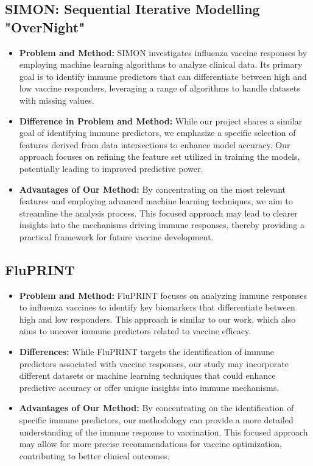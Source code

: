 \documentclass[runningheads,a4paper,11pt]{report}
\begin{document}
\subsection{SIMON: Sequential Iterative Modelling "OverNight"} \cite{SIMON1}
\begin{itemize}
    \item \textbf{Problem and Method:} SIMON investigates influenza vaccine responses by employing machine learning algorithms to analyze clinical data. Its primary goal is to identify immune predictors that can differentiate between high and low vaccine responders, leveraging a range of algorithms to handle datasets with missing values.
    \item \textbf{Difference in Problem and Method:} While our project shares a similar goal of identifying immune predictors, we emphasize a specific selection of features derived from data intersections to enhance model accuracy. Our approach focuses on refining the feature set utilized in training the models, potentially leading to improved predictive power.
    \item \textbf{Advantages of Our Method:} By concentrating on the most relevant features and employing advanced machine learning techniques, we aim to streamline the analysis process. This focused approach may lead to clearer insights into the mechanisms driving immune responses, thereby providing a practical framework for future vaccine development.
\end{itemize}

\subsection{FluPRINT} \cite{FLUPRINT1}
\label{section:FluPRINT}

\begin{itemize}
    \item \textbf{Problem and Method:} FluPRINT focuses on analyzing immune responses to influenza vaccines to identify key biomarkers that differentiate between high and low responders. This approach is similar to our work, which also aims to uncover immune predictors related to vaccine efficacy.
    
    \item \textbf{Differences:} While FluPRINT targets the identification of immune predictors associated with vaccine responses, our study may incorporate different datasets or machine learning techniques that could enhance predictive accuracy or offer unique insights into immune mechanisms.

    \item \textbf{Advantages of Our Method:} By concentrating on the identification of specific immune predictors, our methodology can provide a more detailed understanding of the immune response to vaccination. This focused approach may allow for more precise recommendations for vaccine optimization, contributing to better clinical outcomes.
\end{itemize}
\end{document}
